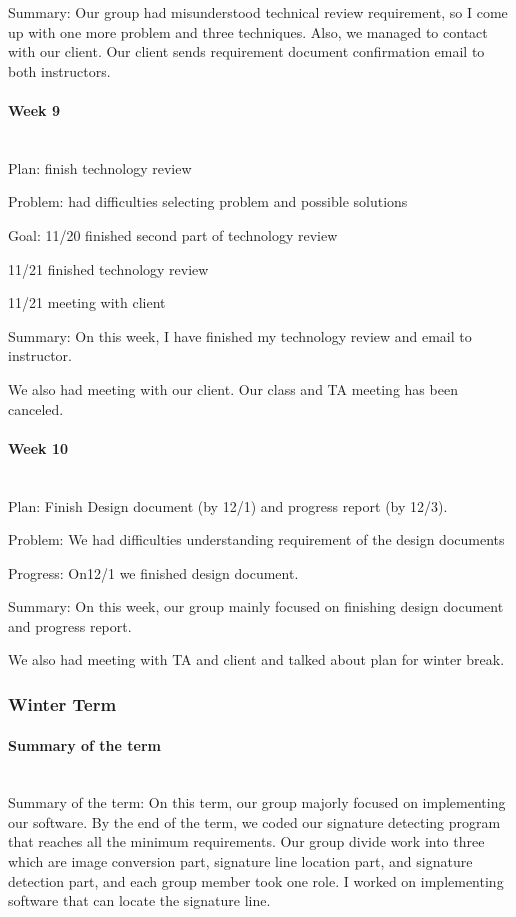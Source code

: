 \documentclass[article, onecolumn, draftclsnofoot,10pt, compsoc]{IEEEtran}
\begin{document}
Summary: Our group had misunderstood technical review requirement, so I come up with one more problem and three techniques. Also, we managed to contact with our client. Our client sends requirement document confirmation email to both instructors.

\paragraph{Week 9}
\mbox{}\\
Plan: finish technology review

Problem: had difficulties selecting problem and possible solutions

Goal: 11/20 finished second part of technology review

11/21 finished technology review

11/21 meeting with client

Summary: On this week, I have finished my technology review and email to instructor.

We also had meeting with our client. Our class and TA meeting has been canceled.

\paragraph{Week 10}
\mbox{}\\
Plan: Finish Design document (by 12/1) and progress report (by 12/3).

Problem: We had difficulties understanding requirement of the design documents

Progress: On12/1 we finished design document.

Summary: On this week, our group mainly focused on finishing design document and progress report.

We also had meeting with TA and client and talked about plan for winter break.

\subsubsection{Winter Term}
\paragraph{Summary of the term}
\mbox{}\\
Summary of the term: On this term, our group majorly focused on implementing our software. By the end of the term, we coded our signature detecting program that reaches all the minimum requirements. Our group divide work into three which are image conversion part, signature line location part, and signature detection part, and each group member took one role. I worked on implementing software that can locate the signature line.
\end{document}

